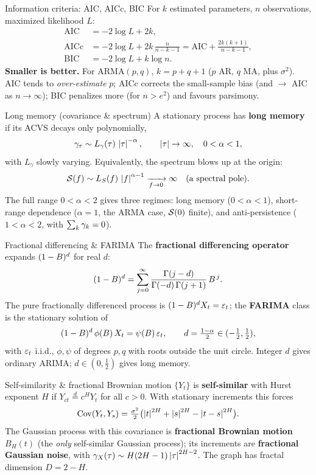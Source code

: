 \documentclass[11pt]{article}
\begin{document}
\begin{defn}{Information criteria: AIC, AICc, BIC}
For $k$ estimated parameters, $n$ observations, maximized likelihood $L$:
\[
\begin{aligned}
\mathrm{AIC}  &= -2\log L + 2k, \\
\mathrm{AICc} &= -2\log L + 2k\,\tfrac{n}{n-k-1}
              = \mathrm{AIC} + \tfrac{2k(k+1)}{n-k-1}, \\
\mathrm{BIC}  &= -2\log L + k\log n.
\end{aligned}
\]
\textbf{Smaller is better.} For ARMA$(p,q)$, $k=p+q+1$ ($p$ AR, $q$ MA, plus $\sigma^2$). AIC tends to \emph{over-estimate} $p$; AICc corrects the small-sample bias (and $\to$ AIC as $n\to\infty$); BIC penalizes more (for $n>e^2$) and favours parsimony.
\end{defn}

\begin{defn}{Long memory (covariance \& spectrum)}
A stationary process has \textbf{long memory} if its ACVS decays only polynomially,
\[
\gamma_\tau \sim L_\gamma(\tau)\,\left\lvert \tau \right\rvert^{-\alpha},\qquad \left\lvert \tau \right\rvert\to\infty,\quad 0<\alpha<1,
\]
with $L_\gamma$ slowly varying. Equivalently, the spectrum blows up at the origin:
\[
\mathcal{S}(f)\sim L_S(f)\,\left\lvert f \right\rvert^{\alpha-1}\xrightarrow[f\to0]{}\infty
\quad(\text{a spectral pole}).
\]
The full range $0<\alpha<2$ gives three regimes: long memory ($0<\alpha<1$), short-range dependence ($\alpha=1$, the ARMA case, $\mathcal{S}(0)$ finite), and anti-persistence ($1<\alpha<2$, with $\sum_k\gamma_k=0$).
\end{defn}

\begin{defn}{Fractional differencing \& FARIMA}
The \textbf{fractional differencing operator} expands $(1-B)^d$ for real $d$:
\[
(1-B)^d=\sum_{j=0}^{\infty}\frac{\Gamma(j-d)}{\Gamma(-d)\,\Gamma(j+1)}\,B^{\,j}.
\]
The pure fractionally differenced process is $(1-B)^d X_t=\varepsilon_t$; the \textbf{FARIMA} class is the stationary solution of
\[
(1-B)^d\,\phi(B)\,X_t=\psi(B)\,\varepsilon_t,\qquad d=\tfrac{1-\alpha}{2}\in(-\tfrac12,\tfrac12),
\]
with $\varepsilon_t$ i.i.d., $\phi,\psi$ of degrees $p,q$ with roots outside the unit circle. Integer $d$ gives ordinary ARIMA; $d\in(0,\tfrac12)$ gives long memory.
\end{defn}

\begin{defn}{Self-similarity \& fractional Brownian motion}
$\{Y_t\}$ is \textbf{self-similar} with Hurst exponent $H$ if $Y_{ct}\overset{d}{=}c^H Y_t$ for all $c>0$. With stationary increments this forces
\[
\operatorname{Cov}(Y_t,Y_s)=\tfrac{\sigma^2}{2}\bigl(\left\lvert t \right\rvert^{2H}+\left\lvert s \right\rvert^{2H}-\left\lvert t-s \right\rvert^{2H}\bigr).
\]
The Gaussian process with this covariance is \textbf{fractional Brownian motion} $B_H(t)$ (the \emph{only} self-similar Gaussian process); its increments are \textbf{fractional Gaussian noise}, with $\gamma_X(\tau)\sim H(2H-1)\left\lvert \tau \right\rvert^{2H-2}$. The graph has fractal dimension $D=2-H$.
\end{defn}
\end{document}
